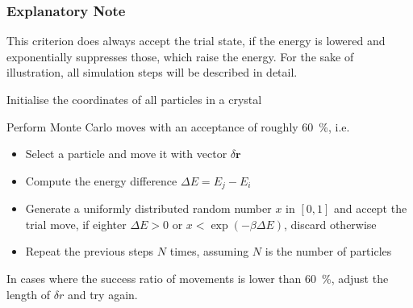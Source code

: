 \subsubsection*{Explanatory Note}
This criterion does always accept the trial state, if the energy is lowered and exponentially suppresses those, which raise the energy.
For the sake of illustration, all simulation steps will be described in detail.
\begin{enumerate}
	\item{Initialise the coordinates of all particles in a crystal}
	\item{Perform Monte Carlo moves with an acceptance of roughly \SI{60}{\percent}, i.e.
		\begin{itemize}
			\item{Select a particle and move it with vector $\delta \bm r$}
			\item{Compute the energy difference $\Delta E = E_j - E_i$}
			\item{Generate a uniformly distributed random number $x$ in $[0, 1]$ and accept the trial move, if eighter $\Delta E>0$ or $x < \exp(-\beta\Delta E)$, discard otherwise}
			\item{Repeat the previous steps $N$ times, assuming $N$ is the number of particles}
		\end{itemize}
	\item{In cases where the success ratio of movements is lower than \SI{60}{\percent}, adjust the length of $\delta r$ and try again.}
}
\end{enumerate}

